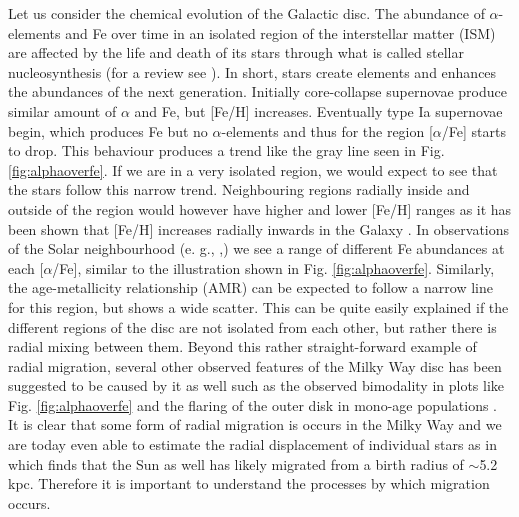 Let us consider the chemical evolution of the Galactic disc. The abundance of $\alpha$-elements and Fe over time in an isolated region of the interstellar matter (ISM) are affected by the life and death of its stars through what is called stellar nucleosynthesis (for a review see \citealt{edvardsson:1993}). In short, stars create elements and enhances the abundances of the next generation. Initially core-collapse supernovae produce similar amount of $\alpha$ and Fe, but [Fe/H] increases. Eventually type Ia supernovae begin, which produces Fe but no $\alpha$-elements and thus for the region [$\alpha$/Fe] starts to drop. This behaviour produces a trend like the gray line seen in Fig. \ref{fig:alphaoverfe}. If we are in a very isolated region, we would expect to see that the stars follow this narrow trend. Neighbouring regions radially inside and outside of the region would however have higher and lower [Fe/H] ranges as it has been shown that [Fe/H] increases radially inwards in the Galaxy \citep{hayden:15}. In observations of the Solar neighbourhood (e. g., \citealt{edvardsson:1993, hayden:15, bensby:14},) we see a range of different Fe abundances at each [$\alpha$/Fe], similar to the illustration shown in Fig. \ref{fig:alphaoverfe}. Similarly, the age-metallicity relationship (AMR) can be expected to follow a narrow line for this region, but shows a wide scatter. This can be quite easily explained if the different regions of the disc are not isolated from each other, but rather there is radial mixing between them. Beyond this rather straight-forward example of radial migration, several other observed features of the Milky Way disc has been suggested to be caused by it as well such as the observed bimodality in plots like Fig. \ref{fig:alphaoverfe} \citep{schonrich:09, toyouchi:2016} and the flaring of the outer disk in mono-age populations \citep{minchev:12}. It is clear that some form of radial migration is occurs in the Milky Way and we are today even able to estimate the radial displacement of individual stars as in \cite{frankel:18} which finds that the Sun as well has likely migrated from a birth radius of {$\sim$}5.2 kpc. Therefore it is important to understand the processes by which migration occurs.

